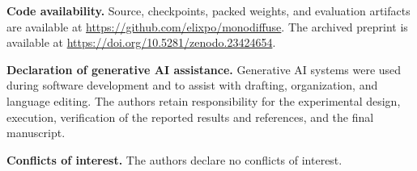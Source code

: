 \documentclass[conference]{IEEEtran}
\begin{document}
\smallskip\noindent\textbf{Code availability.}
Source, checkpoints, packed weights, and evaluation artifacts are available at
\url{https://github.com/elixpo/monodiffuse}. The archived preprint is available
at \url{https://doi.org/10.5281/zenodo.23424654}.

\smallskip\noindent\textbf{Declaration of generative AI assistance.}
Generative AI systems were used during software development and to assist with
drafting, organization, and language editing. The authors retain responsibility
for the experimental design, execution, verification of the reported results
and references, and the final manuscript.

\smallskip\noindent\textbf{Conflicts of interest.}
The authors declare no conflicts of interest.



\end{document}
